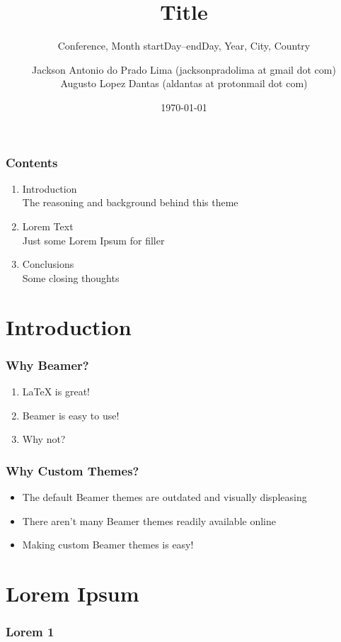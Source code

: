 \documentclass[aspectratio=169]{beamer}
\title{Title}
\author{Jackson Antonio do Prado Lima (jacksonpradolima at gmail dot com) \\  Augusto Lopez Dantas (aldantas at protonmail dot com)}
\date{\today}
\subtitle{\tiny{Conference, Month startDay--endDay, Year, City, Country}}
\begin{document}
	\frame{\titlepage}

	\begin{frame}		
		\frametitle{Contents}
		\begin{enumerate}
			\item Introduction \\ \textcolor{ExecusharesGrey}{\footnotesize\hspace{1em} The reasoning and background behind this theme}
			\item Lorem Text  \\ \textcolor{ExecusharesGrey}{\footnotesize\hspace{1em} Just some Lorem Ipsum for filler}
			\item Conclusions \\ \textcolor{ExecusharesGrey}{\footnotesize\hspace{1em} Some closing thoughts}
		\end{enumerate}
	\end{frame}

	\startprogressbar
	
	\section{Introduction}
		\begin{frame}
			\frametitle{Why Beamer?}
			\begin{enumerate}
				\item LaTeX is great!
				\item Beamer is easy to use!
				\item Why not?
			\end{enumerate}
		\end{frame}

		\begin{frame}
			\frametitle{Why Custom Themes?}
			\begin{itemize}
				\item The default Beamer themes are outdated and visually displeasing
				\item There aren't many Beamer themes readily available online
				\item Making custom Beamer themes is easy!
			\end{itemize}
		\end{frame}

	\section{Lorem Ipsum}
		\begin{frame}
			\frametitle{Lorem 1}
			\blindtext
		\end{frame}
\end{document}

